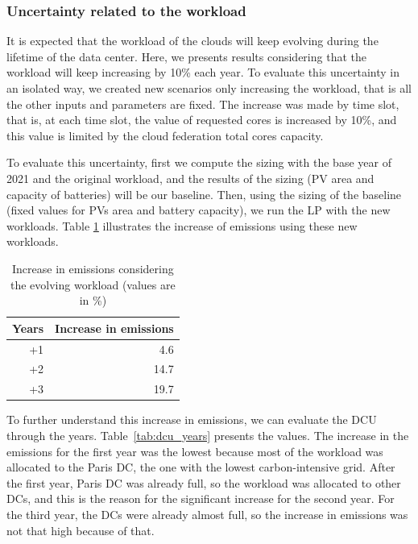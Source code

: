 \subsubsection{Uncertainty related to the workload}

It is expected that the workload of the clouds will keep evolving during the lifetime of the data center. Here, we presents results considering that the workload will keep increasing by 10\% each year. To evaluate this uncertainty in an isolated way, we created new scenarios only increasing the workload, that is all the other inputs and parameters are fixed. The increase was made by time slot, that is, at each time slot, the value of requested cores is increased by 10\%, and this value is limited by the cloud federation total cores capacity.

To evaluate this uncertainty, first we compute the sizing with the base year of 2021 and the original workload, and the results of the sizing (PV area and capacity of batteries) will be our baseline. Then, using the sizing of the baseline (fixed values for PVs area and battery capacity), we run the LP with the new workloads. Table \ref{tab:workload_emissions} illustrates the increase of  emissions using these new workloads.

\begin{table}[H]
  \caption{Increase in  emissions considering the evolving workload (values are in \%) }\label{tab:workload_emissions} \centering
  \begin{tabular}{|r|r|}
   \hline
  \textbf{Years} &   \textbf{Increase in emissions}\\
  \hline
  +1 & 4.6 \\
  \hline
  +2  & 14.7  \\
  \hline
  +3  & 19.7 \\  
  \hline  
\end{tabular}  
\end{table}

To further understand this increase in emissions, we can evaluate the DCU through the years. Table~\ref{tab:dcu_years} presents the values. The increase in the emissions for the first year was the lowest because most of the workload was allocated to the Paris DC, the one with the lowest carbon-intensive grid. After the first year, Paris DC was already full, so the workload was allocated to other DCs, and this is the reason for the significant increase for the second year. For the third year, the DCs were already almost full, so the increase in emissions was not that high because of that.


